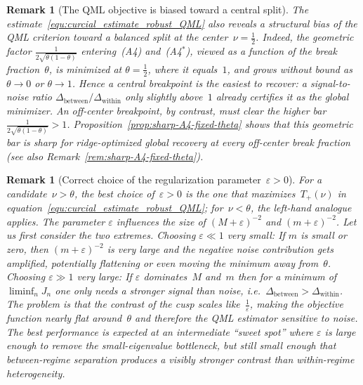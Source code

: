 \documentclass[10pt, letterpaper]{amsart}
\newtheorem{remark}[theorem]{Remark}
\begin{document}
\begin{remark}[The QML objective is biased toward a central split]\label{rem:centering_bias}
The estimate~\eqref{equ:curcial_estimate_robust_QML} also reveals a structural bias of the QML criterion toward a balanced split at the center~$\nu=\tfrac12$. Indeed, the geometric factor $\tfrac{1}{2\sqrt{\theta(1-\theta)}}$ entering~(A4) and~(A4$^\ast$), viewed as a function of the break fraction~$\theta$, is minimized at $\theta=\tfrac12$, where it equals~$1$, and grows without bound as $\theta\to0$ or $\theta\to1$. Hence a central breakpoint is the easiest to recover: a signal-to-noise ratio $\Delta_{\text{between}}/\Delta_{\text{within}}$ only slightly above~$1$ already certifies it as the global minimizer. An off-center breakpoint, by contrast, must clear the higher bar $\tfrac{1}{2\sqrt{\theta(1-\theta)}}>1$. Proposition~\ref{prop:sharp-A4-fixed-theta} shows that this geometric bar is sharp for ridge-optimized global recovery at every off-center break fraction (see also Remark~\ref{rem:sharp-A4-fixed-theta}).
\end{remark}

\begin{remark}[Correct choice of the regularization parameter~$\varepsilon>0$]
For a candidate~$\nu>\theta$, the best choice of~$\varepsilon >0$ is the one that maximizes~$T_+(\nu)$ in equation~\eqref{equ:curcial_estimate_robust_QML}; for~$\nu<\theta$, the left-hand analogue applies. The parameter $\varepsilon$ influences the size of $(M+\varepsilon)^{-2}$ and $(m+\varepsilon)^{-2}$. Let us first consider the two extremes. Choosing $\varepsilon \ll 1$ very small: If $m$ is small or zero, then
$(m+\varepsilon)^{-2}$ is very large and the negative noise contribution gets amplified, potentially
flattening or even moving the minimum away from~$\theta$. Choosing $\varepsilon \gg 1$ very large: If $\varepsilon$ dominates~$M$ and~$m$ then for a minimum of~$ \liminf_n J_n$ one only needs a stronger signal than noise, i.e.~$\Delta_{\text{between}} > \Delta_{\text{within}}$. The problem is that the contrast of the cusp scales like~$\frac{1}{\varepsilon}$, making the objective function nearly flat around~$\theta$ and therefore the QML estimator sensitive to noise. The best performance is expected at an intermediate ``sweet spot'' where
$\varepsilon$ is large enough to remove the small-eigenvalue bottleneck, but still small enough that between-regime separation produces a visibly
stronger contrast than within-regime heterogeneity.  
\end{remark}
\end{document}
